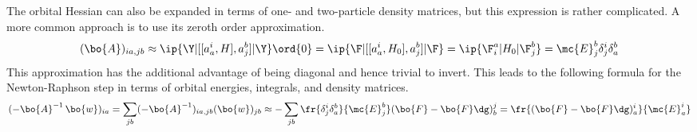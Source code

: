 \begin{rmk}
The orbital Hessian can also be expanded in terms of one- and two-particle density matrices, but this expression is rather complicated.
A more common approach is to use its zeroth order approximation.
\begin{align}
  (\bo{A})_{ia,jb}
\approx
  \ip{\Y|[[a^i_a, H], a^b_j]|\Y}\ord{0}
=
  \ip{\F|[[a^i_a, H_0], a^b_j]|\F}
=
  \ip{\F^a_i|H_0|\F^b_j}
=
  \mc{E}_j^b
  \delta^i_j
  \delta^b_a
\end{align}
This approximation has the additional advantage of being diagonal and hence trivial to invert.
This leads to the following formula for the Newton-Raphson step in terms of orbital energies, integrals, and density matrices.
\begin{align}
  (-\bo{A}^{-1}\,\bo{w})_{ia}
=
  \sum_{jb}
  (-\bo{A}^{-1})_{ia,jb}
  (\bo{w})_{jb}
\approx
  -
  \sum_{jb}
  \fr{
    \delta^i_j
    \delta^b_a
  }{
    \mc{E}_j^b
  }
  (\bo{F} - \bo{F}\dg)_b^j
=
  \fr{(\bo{F} - \bo{F}\dg)_a^i}{\mc{E}_a^i}
\end{align}
\end{rmk}



